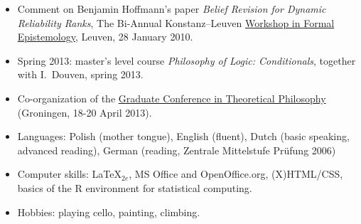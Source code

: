 \documentclass[a4paper,12pt]{article}
\begin{document}
\begin{small}
\begin{itemize}
  \item Comment on Benjamin Hoffmann's paper \emph{Belief Revision for
      Dynamic Reliability Ranks}, The Bi-Annual Konstanz--Leuven
    \href{http://formalphilosophy.org/node/580}{Workshop in Formal
      Epistemology}, Leuven, 28 January 2010.
  \end{itemize}

  



  
  
  \begin{itemize}
  \item Spring 2013: master's level course \emph{Philosophy of Logic:
      Conditionals}, together with I.~Douven, spring 2013.
  \end{itemize}

  
  \begin{itemize}
  \item Co-organization of the
    \href{http://www.philos.rug.nl/GCTP2013/}{Graduate Conference in
      Theoretical Philosophy} (Groningen, 18-20 April 2013).
  \end{itemize}


  \begin{itemize}
  \item Languages: Polish (mother tongue), English (fluent), Dutch
    (basic speaking, advanced reading), German (reading, Zentrale
    Mittelstufe Pr\"ufung 2006)
  \item Computer skills: \LaTeX$_{2e}$, MS Office and OpenOffice.org,
    (X)HTML/CSS, basics of the R environment for statistical
    computing.

  \item Hobbies: playing cello, painting, climbing.
  \end{itemize}


\end{small}
\end{document}
